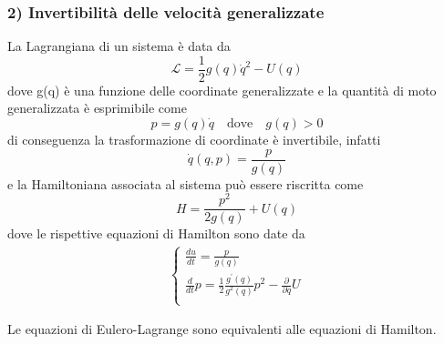 \subsubsection{2) Invertibilit\`{a} delle velocit\`{a} generalizzate}

La Lagrangiana di un sistema \`{e} data da
\begin{equation*}
	\mathcal{L}=\frac{1}{2} g(q) \dot{q}^2-U(q)
\end{equation*}
dove g(q) \`{e} una funzione delle coordinate generalizzate e la quantit\`{a} di moto generalizzata \`{e} esprimibile come
\begin{equation*}
	p=g(q) \dot{q} \quad \text{dove} \quad g(q)>0 
\end{equation*}
di conseguenza la trasformazione di coordinate \`{e} invertibile, infatti
\begin{equation*}
	\dot q(q,p) = \dfrac{p}{g(q)}
\end{equation*}
e la Hamiltoniana associata al sistema pu\`{o} essere riscritta come
\begin{equation*}
	H = \dfrac{p^2}{2g(q)} + U(q)
\end{equation*}
dove le rispettive equazioni di Hamilton sono date da
\begin{align*}
	\begin{cases}
\frac{d u}{d t}=\frac{p}{g(q)} \\
 \frac{d}{d t} p=\frac{1}{2}\frac{g^{\prime}(q)}{g^2(q)} p^2-\frac{\partial}{\partial q} U \\
	\end{cases}
\end{align*}
\vspace{0.1in}

\begin{theorem}
Le equazioni di Eulero-Lagrange sono equivalenti alle equazioni di Hamilton.
\end{theorem}

